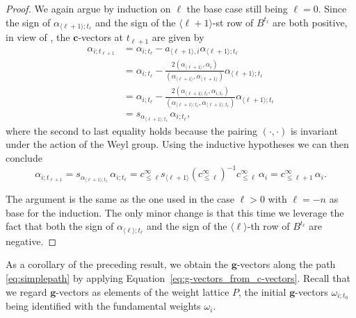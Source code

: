 \documentclass[12pt]{amsart}
\newcommand{\bfc}{\mathbf{c}}
\newcommand{\bfg}{\mathbf{g}}
\newcommand{\cv}{\alpha}
\newcommand{\gv}{\omega}
\renewcommand{\mod}[1]{\langle {#1} \rangle}
\newcommand{\Zidx}{\ell}
\theoremstyle{remark}
\numberwithin{equation}{section}
\numberwithin{figure}{section}
\begin{document}
\begin{proof}
  \noindent{\bf Case $\Zidx > 0$.}
  We again argue by induction on $\Zidx$ the base case still being $\Zidx=0$.
  Since the sign of $\cv_{\mod{\Zidx+1};t_\Zidx}$ and the sign of the $\mod{\Zidx+1}$-st row of $B^{t_\Zidx}$ are both positive, in view of \cite[Proposition 1.3]{NZ12}, the $\bfc$-vectors at $t_{\Zidx+1}$ are given by
  \begin{align*}
    \cv_{i;t_{\Zidx+1}}
    &=
    \cv_{i;t_\Zidx} - a_{\mod{\Zidx+1},i} \cv_{\mod{\Zidx+1};t_\Zidx}\\
    &=
    \cv_{i;t_\Zidx} - \frac{2(\alpha_{\mod{\Zidx+1}},\alpha_i)}{(\alpha_{\mod{\Zidx+1}},\alpha_{\mod{\Zidx+1}})} \cv_{\mod{\Zidx+1};t_\Zidx}\\
    &=
    \cv_{i;t_\Zidx} - \frac{2(\cv_{\mod{\Zidx+1};t_\Zidx},\cv_{i;t_\Zidx})}{(\cv_{\mod{\Zidx+1};t_\Zidx},\cv_{\mod{\Zidx+1};t_\Zidx})} \cv_{\mod{\Zidx+1};t_\Zidx}\\
    &=
    s_{\cv_{\mod{\Zidx+1};t_\Zidx}}\, \cv_{i;t_\Zidx},
  \end{align*}
  where the second to last equality holds because the pairing $(\cdot,\cdot)$ is invariant under the action of the Weyl group.
  Using the inductive hypotheses we can then conclude
  \[
    \cv_{i;t_{\Zidx+1}}
    =
    s_{\cv_{\mod{\Zidx+1};t_\Zidx}}\, \cv_{i;t_\Zidx}
    =
    c^\infty_{\le\Zidx} s_{\mod{\Zidx+1}} \left(c^\infty_{\le\Zidx}\right)^{-1} c^\infty_{\le\Zidx}\, \alpha_i
    =
    c^\infty_{\le\Zidx+1}\, \alpha_i.
  \]

  \noindent{\bf Case $\Zidx < -n$.}
  The argument is the same as the one used in the case $\Zidx>0$ with $\Zidx=-n$ as base for the induction.
  The only minor change is that this time we leverage the fact that both the sign of $\cv_{\mod{\Zidx};t_\Zidx}$ and the sign of the $\mod{\Zidx}$-th row of $B^{t_\Zidx}$ are negative.
\end{proof}

As a corollary of the preceding result,  we obtain the $\bfg$-vectors along the path \eqref{eq:simplepath} by applying Equation~\eqref{eq:g-vectors_from_c-vectors}. Recall that we regard $\bfg$-vectors as elements of the weight lattice $P$, the initial $\bfg$-vectors $\gv_{i;t_0}$ being identified with the fundamental weights $\omega_i$.
\end{document}

